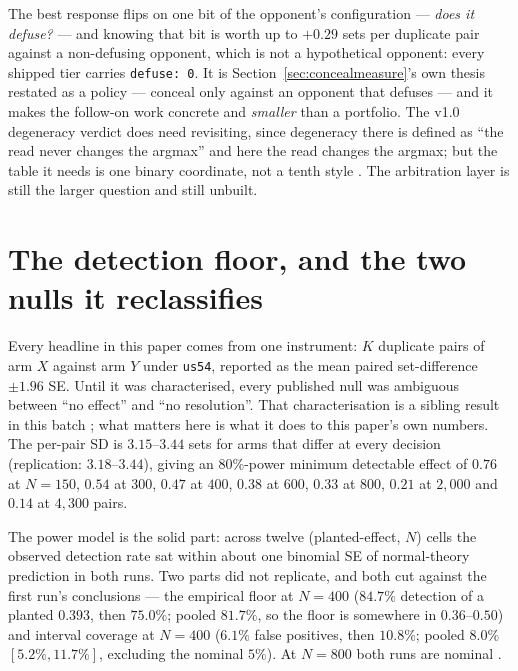 \documentclass[11pt]{article}
\newcommand{\code}[1]{\texttt{#1}}
\newcommand{\usff}{\code{us54}}
\begin{document}
The best response flips on one bit of the opponent's configuration --- \emph{does it defuse?} ---
and knowing that bit is worth up to $+0.29$ sets per duplicate pair against a non-defusing opponent,
which is not a hypothetical opponent: every shipped tier carries \code{defuse: 0}. It is
Section~\ref{sec:concealmeasure}'s own thesis restated as a policy --- conceal only against an
opponent that defuses --- and it makes the follow-on work concrete and \emph{smaller} than a
portfolio. The v1.0 degeneracy verdict does need revisiting, since degeneracy there is defined as
``the read never changes the argmax'' and here the read changes the argmax; but the table it needs
is one binary coordinate, not a tenth style \cite{v10paper,adaptive}. The arbitration layer is still
the larger question and still unbuilt.

\section{The detection floor, and the two nulls it reclassifies}
\label{sec:floor}

Every headline in this paper comes from one instrument: $K$ duplicate pairs of arm $X$ against arm
$Y$ under \usff{}, reported as the mean paired set-difference $\pm 1.96$ SE. Until it was
characterised, every published null was ambiguous between ``no effect'' and ``no resolution''. That
characterisation is a sibling result in this batch \cite{floorpaper}; what matters here is what it
does to this paper's own numbers. The per-pair SD is $3.15$--$3.44$ sets for arms that differ at
every decision (replication: $3.18$--$3.44$), giving an $80\%$-power minimum detectable effect of
$0.76$ at $N = 150$, $0.54$ at $300$, $0.47$ at $400$, $0.38$ at $600$, $0.33$ at $800$, $0.21$ at
$2{,}000$ and $0.14$ at $4{,}300$ pairs.

The power model is the solid part: across twelve (planted-effect, $N$) cells the observed detection
rate sat within about one binomial SE of normal-theory prediction in both runs. Two parts did not
replicate, and both cut against the first run's conclusions --- the empirical floor at $N = 400$
($84.7\%$ detection of a planted $0.393$, then $75.0\%$; pooled $81.7\%$, so the floor is somewhere
in $0.36$--$0.50$) and interval coverage at $N = 400$ ($6.1\%$ false positives, then $10.8\%$;
pooled $8.0\%$ $[5.2\%, 11.7\%]$, excluding the nominal $5\%$). At $N = 800$ both runs are nominal
\cite{floorpaper}.
\end{document}

